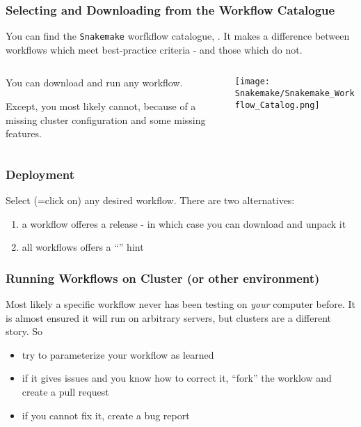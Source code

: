 \begin{frame}
 \frametitle{Selecting and Downloading from the Workflow Catalogue}
 You can find the \texttt{Snakemake} worfkflow catalogue, . It makes a difference between workflows which meet best-practice criteria - and those which do not.\newline
 \begin{columns}
   \begin{column}{0.5\textwidth}
     You can download and run any workflow. \pause\newline
     \begin{warning}
     	Except, you most likely cannot, because of a missing cluster configuration and some missing features.
     \end{warning}
   \end{column}
   \begin{column}{0.5\textwidth}
     \texttt{[image: Snakemake/Snakemake\_Workflow\_Catalog.png]}
   \end{column}
 \end{columns}
\end{frame}

\begin{frame}[fragile]
  \frametitle{Deployment}
  Select (=click on) any desired workflow. There are two alternatives:
  \begin{enumerate}
   \item a workflow offeres a release - in which case you can download and unpack it
   \item all workflows offers a ``'' hint
  \end{enumerate}
\end{frame}

\begin{frame}[fragile]
  \frametitle{Running Workflows on Cluster (or other environment)}
  Most likely a specific workflow never has been testing on \emph{your} computer before. It is almost ensured it will run on arbitrary servers, but clusters are a different story. \newline
  So
  \begin{itemize}[<+->]
   \item try to parameterize your workflow as learned
   \item if it gives issues and you know how to correct it, ``fork'' the worklow and create a pull request
   \item if you cannot fix it, create a bug report
  \end{itemize}
\end{frame}


